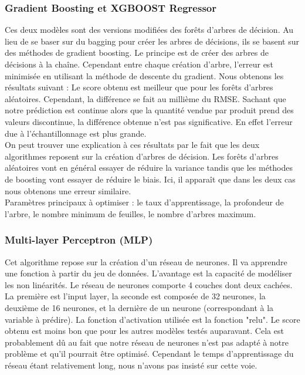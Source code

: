 \documentclass{article} %
\begin{document}
\subsubsection{Gradient Boosting et XGBOOST Regressor}
Ces deux modèles sont des versions modifiées des forêts d'arbres de décision. Au lieu de se baser sur du bagging pour créer les arbres de décisions, ils se basent sur des méthodes de gradient boosting. Le principe est de créer des arbres de décisions à la chaîne. Cependant entre chaque création d'arbre, l'erreur est minimisée en utilisant la méthode de descente du gradient. Nous obtenons les résultats suivant :
Le score obtenu est meilleur que pour les forêts d'arbres aléatoires. Cependant, la différence se fait au millième du RMSE. Sachant que notre prédiction est continue alors que la quantité vendue par produit prend des valeurs discontinue, la différence obtenue n'est pas significative. En effet l'erreur due à l'échantillonnage est plus grande.\\
On peut trouver une explication à ces résultats par le fait que les deux algorithmes reposent sur la création d'arbres de décision. Les forêts d'arbres aléatoires vont en général essayer de réduire la variance tandis que les méthodes de boosting vont essayer de réduire le biais. Ici, il apparaît que dans les deux cas nous obtenons une erreur similaire.\\
Paramètres principaux à optimiser : le taux d'apprentissage, la profondeur de l'arbre, le nombre minimum de feuilles, le nombre d'arbres maximum.

\subsubsection{Multi-layer Perceptron (MLP)}
Cet algorithme repose sur la création d'un réseau de neurones. Il va apprendre une fonction à partir du jeu de données. L'avantage est la capacité de modéliser les non linéarités. Le réseau de neurones comporte 4 couches dont deux cachées. La première est l'input layer, la seconde est composée de 32 neurones, la deuxième de 16 neurones, et la dernière de un neurone (correspondant à la variable à prédire). La fonction d'activation utilisée est la fonction "relu". 
Le score obtenu est moins bon que pour les autres modèles testés auparavant. Cela est probablement dû au fait que notre réseau de neurones n'est pas adapté à notre problème et qu'il pourrait être optimisé. Cependant le temps d'apprentissage du réseau étant relativement long, nous n'avons pas insisté sur cette voie. 
\end{document}
